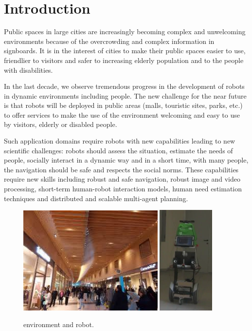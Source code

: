 \section{Introduction}
\label{sec:intro}

Public spaces in large cities are increasingly becoming complex and unwelcoming environments because of the overcrowding and complex information in signboards. It is in the interest of cities to make their public spaces easier to use, friendlier to visitors and safer to increasing elderly population and to the people with disabilities.

In the last decade, we observe tremendous progress in the development of robots in dynamic environments %
including people. The new challenge for the near future is that robots will be deployed in public areas (malls, touristic sites, parks, etc.) to offer services to make the use of the environment welcoming and easy to use by visitors, elderly or disabled people. 

Such application domains require robots with new capabilities leading to new scientific challenges: robots should assess the situation, estimate the needs of people, socially interact in a dynamic way and in a short time, with many people, the navigation should be safe and respects the social norms. These capabilities require new skills including robust and safe navigation, robust image and video processing, short-term human-robot interaction models, human need estimation techniques and distributed and scalable multi-agent planning.

\begin{figure}
\centering
\includegraphics[width=0.65\textwidth]{fig/rivedelorne}
\hspace{0.8cm}
\includegraphics[width=0.255\textwidth]{fig/diago1}
\caption{\coaches environment and robot.}
\label{fig:env}
\end{figure}

